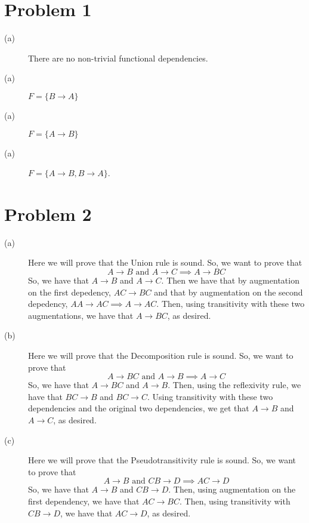 \documentclass{article}
\begin{document}
\section*{Problem 1}
\begin{description}
    \item[(a)] There are no non-trivial functional dependencies.
    \item[(a)] $F = \{B \rightarrow A\}$
    \item[(a)] $F = \{A \rightarrow B\}$
    \item[(a)] $F = \{A \rightarrow B, B \rightarrow A\}$.
\end{description}

\section*{Problem 2}
\begin{description}
    \item[(a)] Here we will prove that the Union rule is sound. So,
        we want to prove that
        \[ A \rightarrow B \text{ and } A \rightarrow C \implies
        A \rightarrow BC \]
        So, we have that $A \rightarrow B$ and $A \rightarrow C$. Then we have
        that by augmentation on the first depedency, $AC \rightarrow BC$ and
        that by augmentation on the second depedency,
        $AA \rightarrow AC \implies A \rightarrow AC$. Then, using transitivity
        with these two augmentations, we have that $A \rightarrow BC$, as desired.
    \item[(b)] Here we will prove that the Decomposition rule is sound. So,
        we want to prove that
        \[ A \rightarrow BC \text{ and } A \rightarrow B \implies
        A \rightarrow C \]
        So, we have that $A \rightarrow BC$ and $A \rightarrow B$. Then, using
        the reflexivity rule, we have that $BC \rightarrow B$ and
        $BC \rightarrow C$. Using transitivity with these two dependencies and
        the original two dependencies, we
        get that $A \rightarrow B$ and $A \rightarrow C$, as desired.
    \item[(c)] Here we will prove that the Pseudotransitivity rule is sound.
        So, we want to prove that
        \[ A \rightarrow B \text{ and } CB \rightarrow D \implies
        AC \rightarrow D \]
        So, we have that $A \rightarrow B$ and $CB \rightarrow D$. Then, using
        augmentation on the first dependency, we have that $AC \rightarrow BC$.
        Then, using transitivity with $CB \rightarrow D$, we have
        that $AC \rightarrow D$, as desired.
\end{description}
\end{document}

